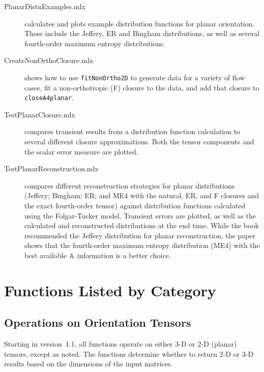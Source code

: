 \documentclass[11pt]{article}
\begin{document}
\begin{description}
    
    \item[PlanarDistnExamples.mlx]{calculates and plots example distribution functions for planar orientation.  These include the Jeffery, ER and Bingham distributions, as well as several fourth-order maximum entropy distributions.}
    
    \item[CreateNonOrthoClosure.mlx]{shows how to use \texttt{fitNonOrtho2D} to generate data for a variety of flow cases, fit a non-orthotropic (F) closure to the data, and add that closure to \texttt{closeA4planar}.}
    
    \item[TestPlanarClosure.mlx]{compares transient results from a distribution function calculation to several different closure approximations.  Both the tensor components and the scalar error measure are plotted.}
    
    \item[TestPlanarReconstruction.mlx]{compares different reconstruction strategies for planar distributions (Jeffery; Bingham; ER; and ME4 with the natural, ER, and F closures and the exact fourth-order tensor) against distribution functions calculated using the Folgar-Tucker model.  Transient errors are plotted, as well as the calculated and reconstructed distributions at the end time.  While the book recommended the Jeffery distribution for planar reconstruction, the paper shows that the fourth-order maximum entropy distribution (ME4) with the best available $\mathbb{A}$ information is a better choice.}
    
        
\end{description}

\section{Functions Listed by Category}

\subsection{Operations on Orientation Tensors}

Starting in version~1.1, all functions operate on either 3-D or 2-D (planar) tensors, except as noted.  The functions determine whether to return 2-D or 3-D results based on the dimensions of the input matrices.  
\end{document}
